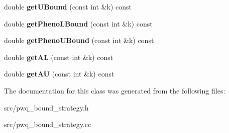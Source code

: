 \begin{DoxyCompactItemize}
\item 
\hypertarget{classlibcmaes_1_1pwqBoundStrategy_a457a0e05a886af1df39f002c1fa85995}{double {\bfseries get\-U\-Bound} (const int \&k) const }\label{classlibcmaes_1_1pwqBoundStrategy_a457a0e05a886af1df39f002c1fa85995}

\item 
\hypertarget{classlibcmaes_1_1pwqBoundStrategy_ae73e1b4b2a5b3790df35d2b9d2e6f79d}{double {\bfseries get\-Pheno\-L\-Bound} (const int \&k) const }\label{classlibcmaes_1_1pwqBoundStrategy_ae73e1b4b2a5b3790df35d2b9d2e6f79d}

\item 
\hypertarget{classlibcmaes_1_1pwqBoundStrategy_a06ec87ccab430f70440efdb6721d807d}{double {\bfseries get\-Pheno\-U\-Bound} (const int \&k) const }\label{classlibcmaes_1_1pwqBoundStrategy_a06ec87ccab430f70440efdb6721d807d}

\item 
\hypertarget{classlibcmaes_1_1pwqBoundStrategy_abac7ef27875331f619b30de7c274a250}{double {\bfseries get\-A\-L} (const int \&k) const }\label{classlibcmaes_1_1pwqBoundStrategy_abac7ef27875331f619b30de7c274a250}

\item 
\hypertarget{classlibcmaes_1_1pwqBoundStrategy_a16ff65bb05a68090f0ecf8df59d71b09}{double {\bfseries get\-A\-U} (const int \&k) const }\label{classlibcmaes_1_1pwqBoundStrategy_a16ff65bb05a68090f0ecf8df59d71b09}

\end{DoxyCompactItemize}


The documentation for this class was generated from the following files\-:\begin{DoxyCompactItemize}
\item 
src/pwq\-\_\-bound\-\_\-strategy.\-h\item 
src/pwq\-\_\-bound\-\_\-strategy.\-cc\end{DoxyCompactItemize}
